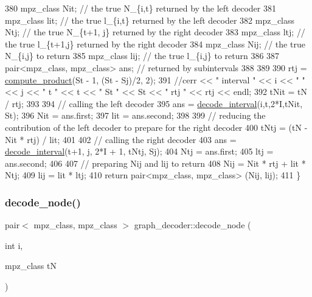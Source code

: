 \begin{DoxyCode}
380   mpz\_class Nit; \textcolor{comment}{// the true N\_\{i,t\} returned by the left decoder}
381   mpz\_class lit; \textcolor{comment}{// the true l\_\{i,t\} returned by the left decoder}
382   mpz\_class Ntj; \textcolor{comment}{// the true N\_\{t+1, j\} returned by the right decoder}
383   mpz\_class ltj; \textcolor{comment}{// the true l\_\{t+1,j\} returned by the right decoder}
384   mpz\_class Nij; \textcolor{comment}{// the true N\_\{i,j\} to return}
385   mpz\_class lij; \textcolor{comment}{// the true l\_\{i,j\} to return}
386 
387   pair<mpz\_class, mpz\_class> ans; \textcolor{comment}{// returned by subintervals }
388 
389 
390   rtj = \hyperlink{compression__helper_8cpp_ae2afb43aabe50f7d42aae8f82b5a35f4}{compute\_product}(St - 1, (St - Sj)/2, 2);
391   \textcolor{comment}{//cerr << " interval " << i << " " << j << " t " << t << " St " << St << " rtj " << rtj << endl;}
392   tNit = tN / rtj;
393 
394   \textcolor{comment}{// calling the left decoder }
395   ans = \hyperlink{classgraph__decoder_a2cb0bd279889a833d4c825e99eb72410}{decode\_interval}(i,t,2*I,tNit, St); 
396   Nit = ans.first;
397   lit = ans.second;
398 
399   \textcolor{comment}{// reducing the contribution of the left decoder to prepare for the right decoder}
400   tNtj = (tN - Nit * rtj) / lit;
401 
402   \textcolor{comment}{// calling the right decoder}
403   ans = \hyperlink{classgraph__decoder_a2cb0bd279889a833d4c825e99eb72410}{decode\_interval}(t+1, j, 2*I + 1, tNtj, Sj);
404   Ntj = ans.first;
405   ltj = ans.second;
406 
407   \textcolor{comment}{// preparing Nij and lij to return}
408   Nij = Nit * rtj + lit * Ntj;
409   lij = lit * ltj;
410   \textcolor{keywordflow}{return} pair<mpz\_class, mpz\_class> (Nij, lij);
411 \}
\end{DoxyCode}
\mbox{\label{classgraph__decoder_af3ff99a4de6035ad257ebd7c6519cdd8}} 
\subsubsection{\texorpdfstring{decode\+\_\+node()}{decode\_node()}}
{\footnotesize\ttfamily pair$<$ mpz\+\_\+class, mpz\+\_\+class $>$ graph\+\_\+decoder\+::decode\+\_\+node (\begin{DoxyParamCaption}\item[{int}]{i,  }\item[{mpz\+\_\+class}]{tN }\end{DoxyParamCaption})}



